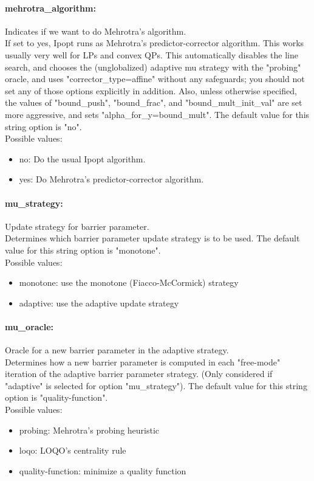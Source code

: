 \paragraph{mehrotra\_algorithm:}\label{opt:mehrotra_algorithm} Indicates if we want to do Mehrotra's algorithm. \\
 If set to yes, Ipopt runs as Mehrotra's
predictor-corrector algorithm. This works usually
very well for LPs and convex QPs.  This
automatically disables the line search, and
chooses the (unglobalized) adaptive mu strategy
with the "probing" oracle, and uses
"corrector\_type=affine" without any safeguards;
you should not set any of those options
explicitly in addition.  Also, unless otherwise
specified, the values of "bound\_push",
"bound\_frac", and "bound\_mult\_init\_val" are
set more aggressive, and sets
"alpha\_for\_y=bound\_mult". The default value for this string option is "no".
\\ 
Possible values:
\begin{itemize}
   \item no: Do the usual Ipopt algorithm.
   \item yes: Do Mehrotra's predictor-corrector algorithm.
\end{itemize}

\paragraph{mu\_strategy:}\label{opt:mu_strategy} Update strategy for barrier parameter. \\
 Determines which barrier parameter update
strategy is to be used. The default value for this string option is "monotone".
\\ 
Possible values:
\begin{itemize}
   \item monotone: use the monotone (Fiacco-McCormick) strategy
   \item adaptive: use the adaptive update strategy
\end{itemize}

\paragraph{mu\_oracle:}\label{opt:mu_oracle} Oracle for a new barrier parameter in the adaptive strategy. \\
 Determines how a new barrier parameter is
computed in each "free-mode" iteration of the
adaptive barrier parameter strategy. (Only
considered if "adaptive" is selected for option
"mu\_strategy"). The default value for this string option is "quality-function".
\\ 
Possible values:
\begin{itemize}
   \item probing: Mehrotra's probing heuristic
   \item loqo: LOQO's centrality rule
   \item quality-function: minimize a quality function
\end{itemize}

